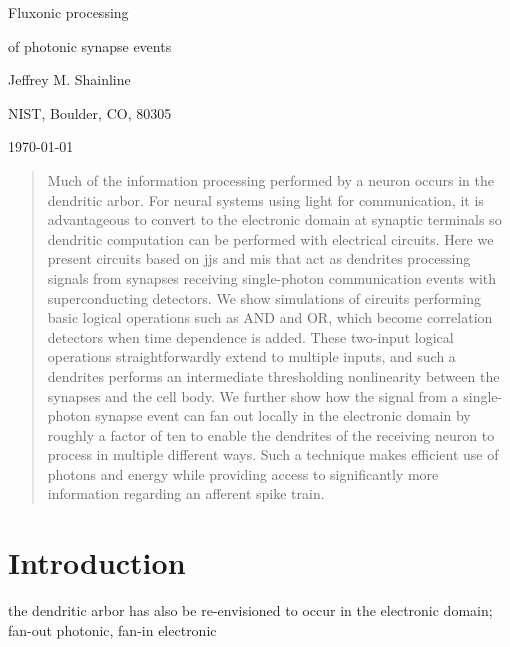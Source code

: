 \documentclass[twocolumn]{article}
\begin{document}
	
	\centerline{\LARGE Fluxonic processing}
	\vspace{0.5em}
	\centerline{\LARGE of photonic synapse events}
	\vspace{0.75em}
	\centerline{\large Jeffrey M. Shainline}
	\vspace{0.5em}
	\centerline{\normalsize NIST, Boulder, CO, 80305}
	\vspace{0.5em}
	\centerline{\small \today}
	
\begin{abstract}
Much of the information processing performed by a neuron occurs in the dendritic arbor. For neural systems using light for communication, it is advantageous to convert to the electronic domain at synaptic terminals so dendritic computation can be performed with electrical circuits. Here we present circuits based on jjs and mis that act as dendrites processing signals from synapses receiving single-photon communication events with superconducting detectors. We show simulations of circuits performing basic logical operations such as AND and OR, which become correlation detectors when time dependence is added. These two-input logical operations straightforwardly extend to multiple inputs, and such a dendrites performs an intermediate thresholding nonlinearity between the synapses and the cell body. We further show how the signal from a single-photon synapse event can fan out locally in the electronic domain by roughly a factor of ten to enable the dendrites of the receiving neuron to process in multiple different ways. Such a technique makes efficient use of photons and energy while providing access to significantly more information regarding an afferent spike train.
\end{abstract}

\tableofcontents

\section{\label{sec:introduction}Introduction}
	
the dendritic arbor has also be re-envisioned to occur in the electronic domain; fan-out photonic, fan-in electronic	

\begin{figure} 
\end{figure}
\end{document}
